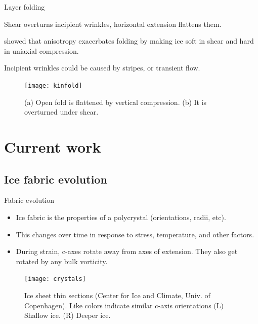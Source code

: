 \documentclass{beamer}
\begin{document}
\begin{frame}{Layer folding}
   \begin{itemize} \small{
      \item Shear overturns incipient wrinkles, horizontal extension flattens them.
      \item \citet{throstur2002} showed that anisotropy exacerbates folding by making ice soft in shear and hard in uniaxial compression.
      \item Incipient wrinkles could be caused by stripes, or transient flow.
      }
   \end{itemize}
   \begin{figure}
      \texttt{[image: kinfold]}
      \caption{\small{(a) Open fold is flattened by vertical compression. (b) It is overturned under shear. \citet{throstur2002}}}
   \end{figure}
\end{frame}
\section{Current work}

\subsection{Ice fabric evolution}

\begin{frame}{Fabric evolution}
   \begin{itemize}
      \item Ice fabric is the properties of a polycrystal (orientations, radii, etc). 
      \item This changes over time in response to stress, temperature, and other factors.
      \item During strain, c-axes rotate away from axes of extension. They also get rotated by any bulk vorticity.
   \end{itemize}
   \begin{figure}
      \texttt{[image: crystals]}
      \caption{\small{Ice sheet thin sections (Center for Ice and Climate, Univ. of Copenhagen). Like colors indicate similar c-axis orientations (L) Shallow ice. (R) Deeper ice.}}
\end{figure}
\end{frame}
\end{document}
